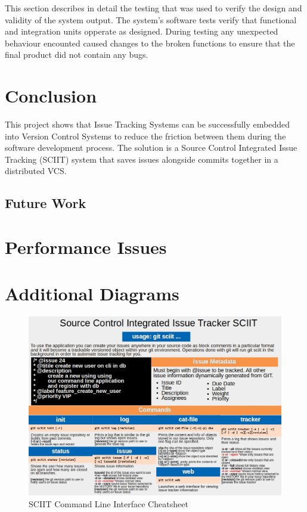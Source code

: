 \documentclass{mproj}
\begin{document}
This section describes in detail the testing that was used to verify the design and validity of the system output. The system's software tests verify that functional and integration units opperate as designed. During testing any unexpected behaviour encounted caused changes to the broken functions to ensure that the final product did not contain any bugs.

\chapter{Conclusion}\label{conclusion}

This project shows that Issue Tracking Systems can be successfully embedded into Version Control Systems to reduce the friction between them during the software development process. The solution is a Source Control Integrated Issue Tracking (SCIIT) system that saves issues alongside commits together in a distributed VCS.

\section{Future Work}




\appendix %
\chapter{Performance Issues}


\chapter{Additional Diagrams}
\begin{figure}[h!]
\caption{SCIIT Command Line Interface Cheatsheet}
\label{fig:sciit-cheatsheet}
\centering
\includegraphics[width=16cm]{Cheatsheet}
\end{figure}
\end{document}
